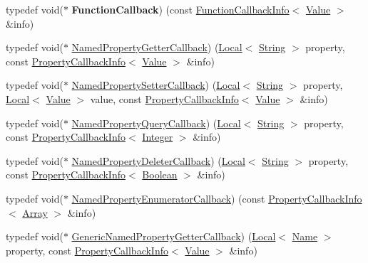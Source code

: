 \begin{DoxyCompactItemize}
\item 
\hypertarget{namespacev8_a9eb0624666bb117aea1fb9c9424dcc1b}{}typedef void($\ast$ {\bfseries Function\+Callback}) (const \hyperlink{classv8_1_1_function_callback_info}{Function\+Callback\+Info}$<$ \hyperlink{classv8_1_1_value}{Value} $>$ \&info)\label{namespacev8_a9eb0624666bb117aea1fb9c9424dcc1b}

\item 
typedef void($\ast$ \hyperlink{namespacev8_a50cae386a68bf9ff23d02aa1161face4}{Named\+Property\+Getter\+Callback}) (\hyperlink{classv8_1_1_local}{Local}$<$ \hyperlink{classv8_1_1_string}{String} $>$ property, const \hyperlink{classv8_1_1_property_callback_info}{Property\+Callback\+Info}$<$ \hyperlink{classv8_1_1_value}{Value} $>$ \&info)
\item 
typedef void($\ast$ \hyperlink{namespacev8_a9587769513971dc7cb301b740d9e66b6}{Named\+Property\+Setter\+Callback}) (\hyperlink{classv8_1_1_local}{Local}$<$ \hyperlink{classv8_1_1_string}{String} $>$ property, \hyperlink{classv8_1_1_local}{Local}$<$ \hyperlink{classv8_1_1_value}{Value} $>$ value, const \hyperlink{classv8_1_1_property_callback_info}{Property\+Callback\+Info}$<$ \hyperlink{classv8_1_1_value}{Value} $>$ \&info)
\item 
typedef void($\ast$ \hyperlink{namespacev8_ac135beae5f0c8b290255accb438f990e}{Named\+Property\+Query\+Callback}) (\hyperlink{classv8_1_1_local}{Local}$<$ \hyperlink{classv8_1_1_string}{String} $>$ property, const \hyperlink{classv8_1_1_property_callback_info}{Property\+Callback\+Info}$<$ \hyperlink{classv8_1_1_integer}{Integer} $>$ \&info)
\item 
typedef void($\ast$ \hyperlink{namespacev8_aaba861076c5b111912cfa0791d348437}{Named\+Property\+Deleter\+Callback}) (\hyperlink{classv8_1_1_local}{Local}$<$ \hyperlink{classv8_1_1_string}{String} $>$ property, const \hyperlink{classv8_1_1_property_callback_info}{Property\+Callback\+Info}$<$ \hyperlink{classv8_1_1_boolean}{Boolean} $>$ \&info)
\item 
typedef void($\ast$ \hyperlink{namespacev8_a5f6f16818a9cddacadbfe6d90ca3a6b1}{Named\+Property\+Enumerator\+Callback}) (const \hyperlink{classv8_1_1_property_callback_info}{Property\+Callback\+Info}$<$ \hyperlink{classv8_1_1_array}{Array} $>$ \&info)
\item 
typedef void($\ast$ \hyperlink{namespacev8_a24b1801fa53a7c5a71366d8044927563}{Generic\+Named\+Property\+Getter\+Callback}) (\hyperlink{classv8_1_1_local}{Local}$<$ \hyperlink{classv8_1_1_name}{Name} $>$ property, const \hyperlink{classv8_1_1_property_callback_info}{Property\+Callback\+Info}$<$ \hyperlink{classv8_1_1_value}{Value} $>$ \&info)

\end{DoxyCompactItemize}
